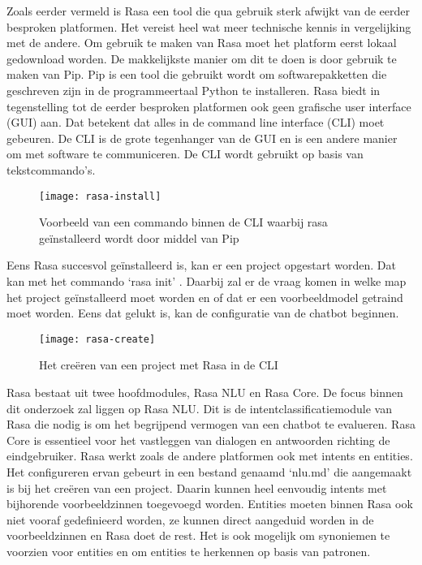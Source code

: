 Zoals eerder vermeld is Rasa een tool die qua gebruik sterk afwijkt van de eerder besproken platformen. Het vereist heel wat meer technische kennis in vergelijking met de andere. Om gebruik te maken van Rasa moet het platform eerst lokaal gedownload worden. De makkelijkste manier om dit te doen is door gebruik te maken van Pip. Pip is een tool die gebruikt wordt om softwarepakketten die geschreven zijn in de programmeertaal Python te installeren. Rasa biedt in tegenstelling tot de eerder besproken platformen ook geen grafische user interface (GUI) aan. Dat betekent dat alles in de command line interface (CLI) moet gebeuren. De CLI is de grote tegenhanger van de GUI en is een andere manier om met software te communiceren. De CLI wordt gebruikt op basis van tekstcommando's.

\begin{figure}[H]
    \label{fig:rasa-install}
    \centering
    \texttt{[image: rasa-install]}
    \caption{Voorbeeld van een commando binnen de CLI waarbij rasa geïnstalleerd wordt door middel van Pip}
\end{figure}

Eens Rasa succesvol geïnstalleerd is, kan er een project opgestart worden. Dat kan met het commando ‘rasa init’ . Daarbij zal er de vraag komen in welke map het project geïnstalleerd moet worden en of dat er een voorbeeldmodel getraind moet worden. Eens dat gelukt is, kan de configuratie van de chatbot beginnen.

\begin{figure}[H]
    \label{fig:rasa-create}
    \centering
    \texttt{[image: rasa-create]}
    \caption{Het creëren van een project met Rasa in de CLI}
\end{figure}

Rasa bestaat uit twee hoofdmodules, Rasa NLU en Rasa Core. De focus binnen dit onderzoek zal liggen op Rasa NLU. Dit is de intentclassificatiemodule van Rasa die nodig is om het begrijpend vermogen van een chatbot te evalueren. Rasa Core is essentieel voor het vastleggen van dialogen en antwoorden richting de eindgebruiker. Rasa werkt zoals de andere platformen ook met intents en entities. Het configureren ervan gebeurt in een bestand genaamd ‘nlu.md’ die aangemaakt is bij het creëren van een project. Daarin kunnen heel eenvoudig intents met bijhorende voorbeeldzinnen toegevoegd worden. Entities moeten binnen Rasa ook niet vooraf gedefinieerd worden, ze kunnen direct aangeduid worden in de voorbeeldzinnen en Rasa doet de rest. Het is ook mogelijk om synoniemen te voorzien voor entities en om entities te herkennen op basis van patronen.

